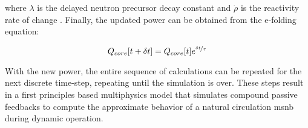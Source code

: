 where $\lambda$ is the delayed neutron precursor decay constant and $\dot{\rho}$ is the reactivity rate of change \cite[Ch. 6]{DH}. Finally, the updated power can be obtained from the e-folding equation:

\begin{equation}
    Q_{core}[t+\delta t] = Q_{core}[t] e^{\nicefrac{\delta t}{\tau}}
\end{equation}

With the new power, the entire sequence of calculations can be repeated for the next discrete time-step, repeating until the simulation is over. These steps result in a first principles based multiphysics model that simulates compound passive feedbacks to compute the approximate behavior of a natural circulation \acs{msnb} during dynamic operation.